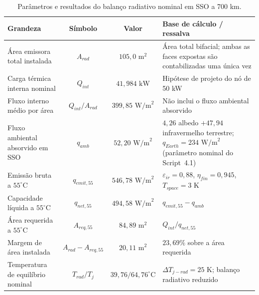 \begin{table}[!ht]
\centering
\small
\renewcommand{\arraystretch}{0.9}
\caption{Parâmetros e resultados do balanço radiativo nominal em SSO a 700 km.}
\label{tab:anexo_dimensionamento_radiativo}
\begin{tabularx}{\textwidth}{>{\raggedright\arraybackslash}p{4.6cm}cc>{\raggedright\arraybackslash}X}
\hline
\textbf{Grandeza} & \textbf{Símbolo} & \textbf{Valor} & \textbf{Base de cálculo / ressalva} \\ \hline
Área emissora total instalada & $A_{rad}$ & $105{,}0\text{ m}^2$ & Área total bifacial; ambas as faces expostas são contabilizadas uma única vez \\
Carga térmica interna nominal & $Q_{int}$ & $41{,}984\text{ kW}$ & Hipótese de projeto do nó de 50 kW \\
Fluxo interno médio por área & $Q_{int}/A_{rad}$ & $399{,}85\text{ W/m}^2$ & Não inclui o fluxo ambiental absorvido \\
Fluxo ambiental absorvido em SSO & $q_{amb}$ & $52{,}20\text{ W/m}^2$ & $4{,}26$ albedo $+47{,}94$ infravermelho terrestre; $q_{Earth}=234\text{ W/m}^2$ (parâmetro nominal do Script~4.1) \\
Emissão bruta a $55^\circ\text{C}$ & $q_{emit,55}$ & $546{,}78\text{ W/m}^2$ & $\varepsilon_{ir}=0{,}88$, $\eta_{fin}=0{,}945$, $T_{space}=3\text{ K}$ \\
Capacidade líquida a $55^\circ\text{C}$ & $q_{net,55}$ & $494{,}58\text{ W/m}^2$ & $q_{emit,55}-q_{amb}$ \\
Área requerida a $55^\circ\text{C}$ & $A_{req,55}$ & $84{,}89\text{ m}^2$ & $Q_{int}/q_{net,55}$ \\
Margem de área instalada & $A_{rad}-A_{req,55}$ & $20{,}11\text{ m}^2$ & $23{,}69\%$ sobre a área requerida \\
Temperatura de equilíbrio nominal & $T_{rad}/T_j$ & $39{,}76/64{,}76^\circ\text{C}$ & $\Delta T_{j-rad}=25\text{ K}$; balanço radiativo reduzido \\
\hline
\end{tabularx}
\end{table}

